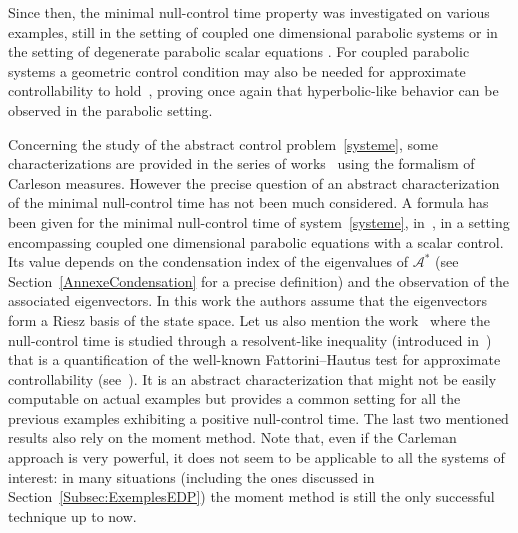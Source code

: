 \documentclass[10pt]{amsart}
\theoremstyle{definition}\newtheorem{defi}[theo]{Definition}\newtheorem{rema}[theo]{Remark}\newtheorem{exam}[theo]{Example}\newtheorem{exem}[theo]{Example}\newtheorem{nota}[theo]{Notation}
\newcommand\As{\mathcal{A}^*}
\begin{document}
Since then, the minimal null-control time property was investigated on various examples, still in the setting of coupled one dimensional parabolic systems \cite{AKBGBdT_JMAA16,Duprez_Tmin2017,Ouaili18,Samb18} or in the setting of degenerate parabolic scalar equations \cite{BeauchardCannarsa17, BeauchardDardeErvedoza, BHHR_Kolmogorov, BeauchardMillerMorancey_Tmin, DuprezKoenig}. For coupled parabolic systems a geometric control condition may also be needed for approximate controllability to hold~\cite{BoyerOlive14, Olive13}, proving once again that hyperbolic-like behavior can be observed in the parabolic setting.

Concerning the study of the abstract control problem~\eqref{systeme}, some characterizations are provided in the series of works~\cite{TheseGaunard,JacobPartingtonPott2007,JacobPartingtonPott2010, JacobPartingtonPott2013,JacobPartingtonPott2014} using the formalism of Carleson measures. However the precise question of an abstract characterization of the minimal null-control time has not been much considered. A formula has been given for the minimal null-control time of system~\eqref{systeme}, in~\cite{AmmarKhodjaBenabdallahGonzalez-BurgosdeTeresa:2014}, in a setting encompassing coupled one dimensional parabolic equations with a scalar control. Its value depends on the condensation index of the eigenvalues of $\As$ (see Section~\ref{AnnexeCondensation} for a precise definition) and the observation of the associated eigenvectors. In this work the authors assume that the eigenvectors form a Riesz basis of the state space. Let us also mention the work~\cite{AKBGBM_2018} where the null-control time is studied through a resolvent-like inequality (introduced in~\cite{DuyckaertsMiller12}) that is a quantification of the well-known Fattorini--Hautus test for approximate controllability (see~\cite{Fattorini66, Olive13}). It is an abstract characterization that might not be easily computable on actual examples but provides a common setting for all the previous examples exhibiting a positive null-control time. The last two mentioned results also rely on the moment method. Note that, even if the Carleman approach is very powerful, it does not seem to be applicable to all the systems of interest: in many situations (including the ones discussed in Section~\ref{Subsec:ExemplesEDP}) the moment method is still the only successful technique up to now.
\end{document}
